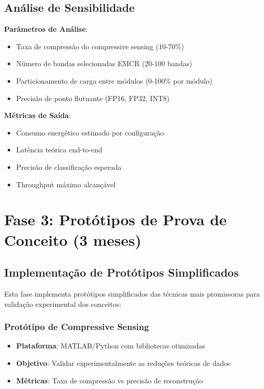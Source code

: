 \subsection{Análise de Sensibilidade}

\textbf{Parâmetros de Análise}:
\begin{itemize}
\item Taxa de compressão do compressive sensing (10-70\%)
\item Número de bandas selecionadas EMCR (20-100 bandas)
\item Particionamento de carga entre módulos (0-100\% por módulo)
\item Precisão de ponto flutuante (FP16, FP32, INT8)
\end{itemize}

\textbf{Métricas de Saída}:
\begin{itemize}
\item Consumo energético estimado por configuração
\item Latência teórica end-to-end
\item Precisão de classificação esperada
\item Throughput máximo alcançável
\end{itemize}

\section{Fase 3: Protótipos de Prova de Conceito (3 meses)}

\subsection{Implementação de Protótipos Simplificados}

Esta fase implementa protótipos simplificados das técnicas mais promissoras para validação experimental dos conceitos:

\subsubsection{Protótipo de Compressive Sensing}

\begin{itemize}
\item \textbf{Plataforma}: MATLAB/Python com bibliotecas otimizadas
\item \textbf{Objetivo}: Validar experimentalmente as reduções teóricas de dados
\item \textbf{Métricas}: Taxa de compressão vs precisão de reconstrução
\end{itemize}

